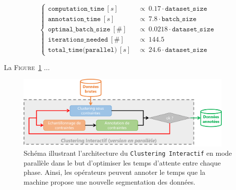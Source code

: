 		
		
		\begin{equation}
			\label{equation:5.4-GUIDE-PARAMETRAGES-ET-COUTS-TEMPS-UNE-ITERATION-PARALLELE}
			\begin{cases}
				\texttt{computation\_time}~[s]&
					~\propto~0.17 \cdot \texttt{dataset\_size}\\
				\texttt{annotation\_time}~[s]&
					~\propto~7.8 \cdot \texttt{batch\_size} \\
				\texttt{optimal\_batch\_size}~[\#]&
					~\propto~0.0218 \cdot \texttt{dataset\_size} \\
				\texttt{iterations\_needed}~[\#] &
					~\propto~144.5 \\
				\texttt{total\_time(parallel)}~[s] &
						~\propto~24.6 \cdot \texttt{dataset\_size}
			\end{cases}
		\end{equation}
		
		
		
		\begin{leftBarImportantGreen}
			La \textsc{Figure~\ref{figure:5.4-GUIDE-PARAMETRAGES-ET-COUTS-ARCHITECTURE-PARALLELE}} ...
			
			\begin{figure}[H]
				\centering
				\includegraphics[width=0.95\textwidth]{figures/interactive-clustering-architecture-parallele}
				\caption{
					Schéma illustrant l'architecture du \texttt{Clustering Interactif} en mode parallèle dans le but d'optimiser les temps d'attente entre chaque phase.
					Ainsi, les opérateurs peuvent annoter le temps que la machine propose une nouvelle segmentation des données.
				}
				\label{figure:5.4-GUIDE-PARAMETRAGES-ET-COUTS-ARCHITECTURE-PARALLELE}
			\end{figure}
		\end{leftBarImportantGreen}
		
